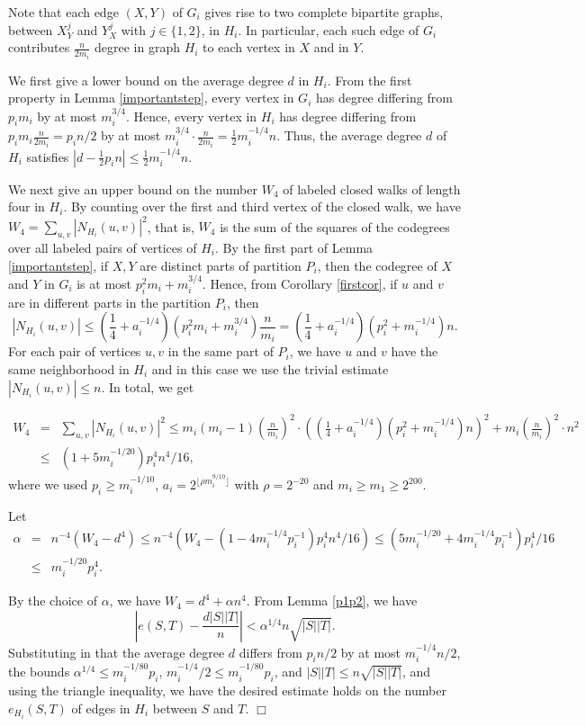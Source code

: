 \documentclass[11pt]{article}
\newenvironment{proof}
      {\medskip\noindent{\bf Proof:}\hspace{1mm}}
      {\hfill$\Box$\medskip}
\begin{document}
\begin{proof}
Note that each edge $(X,Y)$ of $G_i$ gives rise to two complete bipartite
graphs, between $X_Y^j$ and $Y_X^j$ with $j \in \{1,2\}$, in $H_i$. In
particular, each such edge of $G_i$ contributes $\frac{n}{2m_i}$ degree in
graph $H_i$ to each vertex in $X$ and in $Y$.

We first give a lower bound on the average degree $d$ in $H_i$. From the first
property in Lemma \ref{importantstep}, every vertex in $G_i$ has degree
differing from $p_im_i$ by at most $m_i^{3/4}$. Hence, every vertex in $H_i$
has degree differing from $p_im_i \frac{n}{2m_i}=p_in/2$ by at most
$m_i^{3/4}\cdot \frac{n}{2m_i}=\frac{1}{2}m_i^{-1/4}n$. Thus, the average
degree $d$ of $H_i$ satisfies $|d-\frac{1}{2}p_i n| \leq
\frac{1}{2}m_i^{-1/4}n$.

We next give an upper bound on the number $W_4$ of labeled closed walks of
length four in $H_i$. By counting over the first and third vertex of the closed
walk, we have $W_4=\sum_{u,v} |N_{H_i}(u,v)|^2$, that is, $W_4$ is the sum of
the squares of the codegrees over all labeled pairs of vertices of $H_i$.
By the first part of Lemma \ref{importantstep}, if $X,Y$ are distinct parts of
partition $P_i$, then the codegree of $X$ and $Y$ in $G_i$ is at most
$p_i^2m_i+m_i^{3/4}$. Hence, from Corollary \ref{firstcor},
if $u$ and $v$  are in different parts in the partition $P_i$, then
$$|N_{H_i}(u,v)| \leq
(\frac{1}{4}+a_{i}^{-1/4})(p_i^2m_i+m_i^{3/4})\frac{n}{m_i}=(\frac{1}{4}+a_{i}^{-1/4})(p_i^2+m_i^{-1/4})n.$$
For each pair of vertices $u,v$ in the same part of $P_i$, we have $u$ and $v$
have the same neighborhood in $H_i$ and in this case we use the trivial
estimate $|N_{H_i}(u,v)| \leq n$.  In total, we get

\begin{eqnarray*} W_4 & = & \sum_{u,v} |N_{H_i}(u,v)|^2 \leq m_i(m_i-1)
\left(\frac{n}{m_i}\right)^2 \cdot
\left((\frac{1}{4}+a_{i}^{-1/4})(p_i^2+m_i^{-1/4})n\right)^2+m_i
\left(\frac{n}{m_i}\right)^2\cdot n^2 \\ & \leq &
\left(1+5m_i^{-1/20}\right)p_i^4n^4/16,\end{eqnarray*}
where we used $p_i \geq m_i^{-1/10}$, $a_i=2^{\lfloor \rho m_i^{9/10} \rfloor}$
with $\rho = 2^{-20}$ and $m_i \geq m_1 \geq 2^{200}$.

Let \begin{eqnarray*} \alpha & = & n^{-4}\left(W_4-d^4\right) \leq
n^{-4}\left(W_4-(1-4m_i^{-1/4}p_i^{-1})p_i^4n^4/16\right) \leq
\left(5m_i^{-1/20}+4m_i^{-1/4}p_i^{-1}\right)p_i^4/16 \\ & \leq &
m_i^{-1/20}p_i^4. \end{eqnarray*}

By the choice of $\alpha$, we have $W_4 = d^4+\alpha n^4$. From Lemma
\ref{p1p2}, we have
$$|e(S,T)-\frac{d|S||T|}{n}|<\alpha^{1/4}n\sqrt{|S||T|}.$$
Substituting in that the average degree $d$ differs from $p_in/2$ by at most
$m_i^{-1/4}n/2$, the bounds
$\alpha^{1/4} \leq m_i^{-1/80}p_i$, $m_i^{-1/4}/2 \leq m_i^{-1/80}p_i$, and
$|S||T| \leq n\sqrt{|S||T|}$, and using the triangle inequality, we have the
desired estimate holds on the number $e_{H_i}(S,T)$ of edges in $H_i$ between
$S$ and $T$.
\end{proof}
\end{document}
